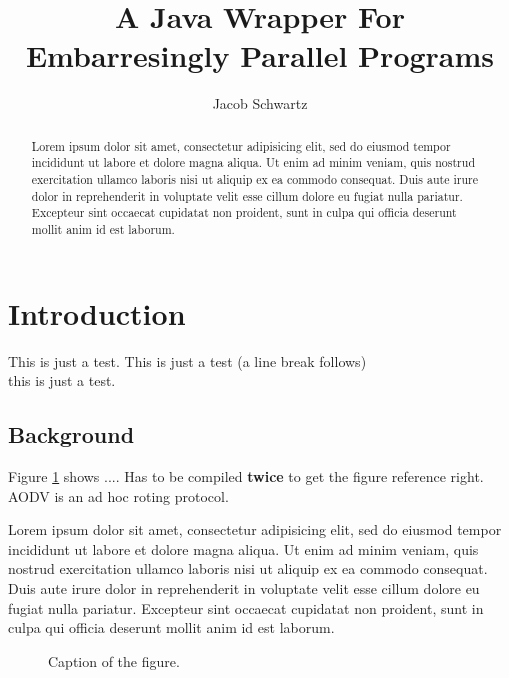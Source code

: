 \documentclass[12pt]{IEEEtran} %
\begin{document}
\title{A Java Wrapper For Embarresingly Parallel Programs}
\author{Jacob Schwartz}
\maketitle

\begin{abstract}
Lorem ipsum dolor sit amet, consectetur adipisicing elit, sed do eiusmod
tempor incididunt ut labore et dolore magna aliqua. Ut enim ad minim
veniam, quis nostrud exercitation ullamco laboris nisi ut aliquip ex ea
commodo consequat. Duis aute irure dolor in reprehenderit in voluptate
velit esse cillum dolore eu fugiat nulla pariatur. Excepteur sint occaecat
cupidatat non proident, sunt in culpa qui officia deserunt mollit anim
id est laborum.
\end{abstract}


\section{Introduction}

This is just a test. This is just a test (a line break follows)\\
this is just a test.


\subsection*{Background}

Figure \ref{fig:figure} shows .... Has to be compiled {\bf twice} to get the 
figure reference right. AODV \cite{aodv} is an ad hoc roting protocol.

Lorem ipsum dolor sit amet, consectetur adipisicing elit, sed do eiusmod
tempor incididunt ut labore et dolore magna aliqua. Ut enim ad minim
veniam, quis nostrud exercitation ullamco laboris nisi ut aliquip ex ea
commodo consequat. Duis aute irure dolor in reprehenderit in voluptate
velit esse cillum dolore eu fugiat nulla pariatur. Excepteur sint occaecat
cupidatat non proident, sunt in culpa qui officia deserunt mollit anim
id est laborum.

\begin{figure}[bht]
\begin{center}
{}
\end{center}
\caption{Caption of the figure.}
\label{fig:figure}
\end{figure}
\end{document}
